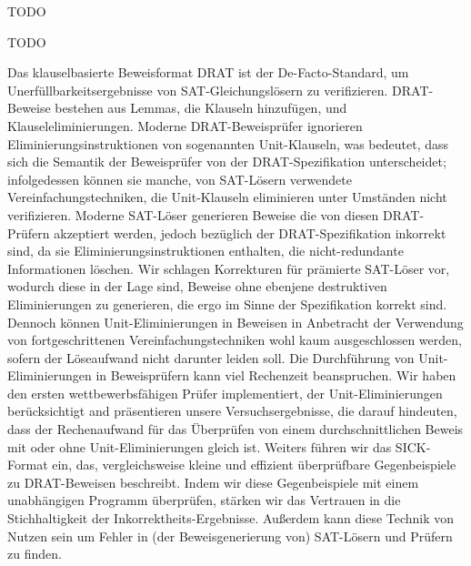 \documentclass[draft,final]{vutinfth} %
\begin{document}
\frontmatter %

\addstatementpage

\begin{danksagung*}
    TODO
\end{danksagung*}

\begin{acknowledgements*}
    TODO
\end{acknowledgements*}
\fi

\begin{kurzfassung}

Das klauselbasierte Beweisformat DRAT ist der De-Facto-Standard, um
Unerfüllbarkeitsergebnisse von SAT-Gleichungslösern zu verifizieren.
DRAT-Beweise bestehen aus Lemmas, die Klauseln hinzufügen,
und Klauseleliminierungen.  Moderne DRAT-Beweisprüfer ignorieren
Eliminierungsinstruktionen von sogenannten Unit-Klauseln, was bedeutet,
dass sich die Semantik der Beweisprüfer von der DRAT-Spezifikation
unterscheidet; infolgedessen können sie manche, von SAT-Lösern verwendete
Vereinfachungstechniken, die Unit-Klauseln eliminieren unter Umständen
nicht verifizieren.  Moderne SAT-Löser generieren Beweise die von diesen
DRAT-Prüfern akzeptiert werden, jedoch bezüglich der DRAT-Spezifikation
inkorrekt sind, da sie Eliminierungsinstruktionen enthalten, die
nicht-redundante Informationen löschen.  Wir schlagen Korrekturen für
prämierte SAT-Löser vor, wodurch diese in der Lage sind, Beweise ohne
ebenjene destruktiven Eliminierungen zu generieren, die ergo im Sinne der
Spezifikation korrekt sind. Dennoch können Unit-Eliminierungen in Beweisen
in Anbetracht der Verwendung von fortgeschrittenen Vereinfachungstechniken
wohl kaum ausgeschlossen werden, sofern der Löseaufwand nicht darunter leiden
soll.  Die Durchführung von Unit-Eliminierungen in Beweisprüfern kann viel
Rechenzeit beanspruchen.  Wir haben den ersten wettbewerbsfähigen Prüfer
implementiert, der Unit-Eliminierungen berücksichtigt and präsentieren
unsere Versuchsergebnisse, die darauf hindeuten, dass der Rechenaufwand
für das Überprüfen von einem durchschnittlichen Beweis mit oder ohne
Unit-Eliminierungen gleich ist.  Weiters führen wir das SICK-Format ein,
das, vergleichsweise kleine und effizient überprüfbare Gegenbeispiele
zu DRAT-Beweisen beschreibt. Indem wir diese Gegenbeispiele mit einem
unabhängigen Programm überprüfen, stärken wir das Vertrauen in die
Stichhaltigkeit der Inkorrektheits-Ergebnisse.  Außerdem kann diese Technik
von Nutzen sein um Fehler in (der Beweisgenerierung von) SAT-Lösern und
Prüfern zu finden.

\end{kurzfassung}
\end{document}
